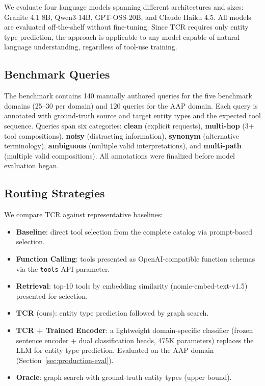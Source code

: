 We evaluate four language models spanning different architectures and sizes:
Granite 4.1 8B,
Qwen3-14B,
GPT-OSS-20B,
and Claude Haiku 4.5.
All models are evaluated off-the-shelf without fine-tuning.
Since TCR requires only entity type prediction, the approach is applicable to any model capable of natural language understanding, regardless of tool-use training.

\subsection{Benchmark Queries}
\label{sec:queries}

The benchmark contains 140 manually authored queries for the five benchmark domains (25--30 per domain) and 120 queries for the AAP domain.
Each query is annotated with ground-truth source and target entity types and the expected tool sequence.
Queries span six categories: \textbf{clean} (explicit requests), \textbf{multi-hop} (3+ tool compositions), \textbf{noisy} (distracting information), \textbf{synonym} (alternative terminology), \textbf{ambiguous} (multiple valid interpretations), and \textbf{multi-path} (multiple valid compositions).
All annotations were finalized before model evaluation began.

\subsection{Routing Strategies}
\label{sec:strategies}

We compare TCR against representative baselines:

\begin{itemize}
    \item \textbf{Baseline}: direct tool selection from the complete catalog via prompt-based selection.
    \item \textbf{Function Calling}: tools presented as OpenAI-compatible function schemas via the \texttt{tools} API parameter.
    \item \textbf{Retrieval}: top-10 tools by embedding similarity (nomic-embed-text-v1.5) presented for selection.
    \item \textbf{TCR} (ours): entity type prediction followed by graph search.
    \item \textbf{TCR + Trained Encoder}: a lightweight domain-specific classifier (frozen sentence encoder + dual classification heads, 475K parameters) replaces the LLM for entity type prediction. Evaluated on the AAP domain (Section~\ref{sec:production-eval}).
    \item \textbf{Oracle}: graph search with ground-truth entity types (upper bound).
\end{itemize}

